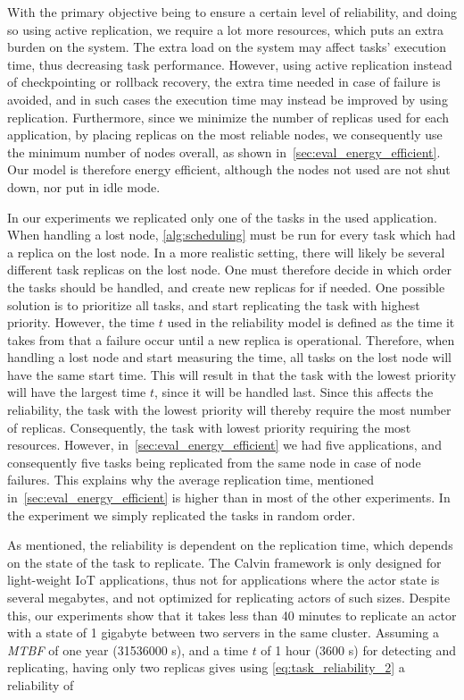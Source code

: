\documentclass{cslthse-msc}
\begin{document}
With the primary objective being to ensure a certain level of reliability, and doing so using active replication, we require a lot more resources, which puts an extra burden on the system. The extra load on the system may affect tasks' execution time, thus decreasing task performance. However, using active replication instead of checkpointing or rollback recovery, the extra time needed in case of failure is avoided, and in such cases the execution time may instead be improved by using replication. Furthermore, since we minimize the number of replicas used for each application, by placing replicas on the most reliable nodes, we consequently use the minimum number of nodes overall, as shown in~\cref{sec:eval_energy_efficient}. Our model is therefore energy efficient, although the nodes not used are not shut down, nor put in idle mode.

In our experiments we replicated only one of the tasks in the used application. When handling a lost node, \cref{alg:scheduling} must be run for every task which had a replica on the lost node. In a more realistic setting, there will likely be several different task replicas on the lost node. One must therefore decide in which order the tasks should be handled, and create new replicas for if needed. One possible solution is to prioritize all tasks, and start replicating the task with highest priority. However, the time $t$ used in the reliability model is defined as the time it takes from that a failure occur until a new replica is operational. Therefore, when handling a lost node and start measuring the time, all tasks on the lost node will have the same start time. This will result in that the task with the lowest priority will have the largest time $t$, since it will be handled last. Since this affects the reliability, the task with the lowest priority will thereby require the most number of replicas. Consequently, the task with lowest priority requiring the most resources. However, in~\cref{sec:eval_energy_efficient} we had five applications, and consequently five tasks being replicated from the same node in case of node failures. This explains why the average replication time, mentioned in~\cref{sec:eval_energy_efficient} is higher than in most of the other experiments. In the experiment we simply replicated the tasks in random order.

As mentioned, the reliability is dependent on the replication time, which depends on the state of the task to replicate. The Calvin framework is only designed for light-weight IoT applications, thus not for applications where the actor state is several megabytes, and not optimized for replicating actors of such sizes. Despite this, our experiments show that it takes less than 40 minutes to replicate an actor with a state of 1 gigabyte between two servers in the same cluster. Assuming a \emph{MTBF} of one year (31536000 s), and a time $t$ of 1 hour (3600 s) for detecting and replicating, having only two replicas gives using \cref{eq:task_reliability_2} a reliability of
\end{document}
